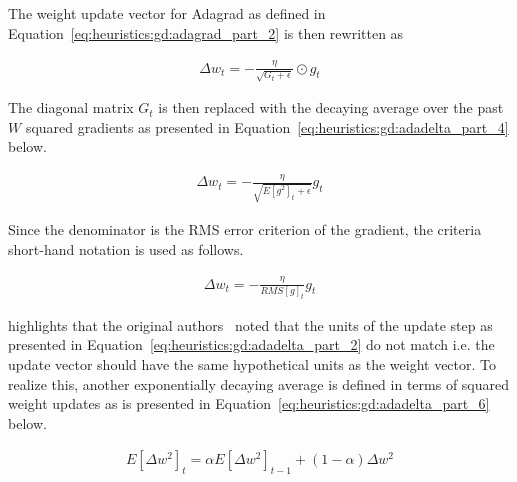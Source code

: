 The weight update vector for \ac{Adagrad} as defined in Equation~\ref{eq:heuristics:gd:adagrad_part_2} is then rewritten as


\begin{equation}
      \label{eq:heuristics:gd:adagrad_part_2_new}
      \begin{split}
            \Delta w_{t} = - \frac{\eta}{\sqrt{G_{t} + \epsilon}} \odot g_{t}
      \end{split}
\end{equation}

The diagonal matrix $G_{t}$ is then replaced with the decaying average over the past $W$ squared gradients as presented in Equation~\ref{eq:heuristics:gd:adadelta_part_4} below.

\begin{equation}
      \label{eq:heuristics:gd:adadelta_part_4}
      \begin{split}
            \Delta w_{t} = - \frac{\eta}{\sqrt{E[g^{2}]_{t} + \epsilon}} g_{t}
      \end{split}
\end{equation}

Since the denominator is the \acs{RMS} error criterion of the gradient, the criteria short-hand notation is used as follows.

\begin{equation}
      \label{eq:heuristics:gd:adadelta_part_5}
      \begin{split}
            \Delta w_{t} = - \frac{\eta}{RMS[g]_{t}} g_{t}
      \end{split}
\end{equation}

\citeauthor{ref:ruder:2016}\cite{ref:ruder:2016} highlights that the original authors~\cite{ref:zeiler:2012} noted that the units of the update step as presented in Equation~\ref{eq:heuristics:gd:adadelta_part_2} do not match i.e. the update vector should have the same hypothetical units as the weight vector. To realize this, another exponentially decaying average is defined in terms of squared weight updates as is presented in Equation~\ref{eq:heuristics:gd:adadelta_part_6} below.

\begin{equation}
      \label{eq:heuristics:gd:adadelta_part_6}
      \begin{split}
            E[\Delta w^{2}]_{t} = \alpha E[\Delta w^{2}]_{t - 1} + (1 - \alpha)\Delta w^{2}
      \end{split}
\end{equation}

